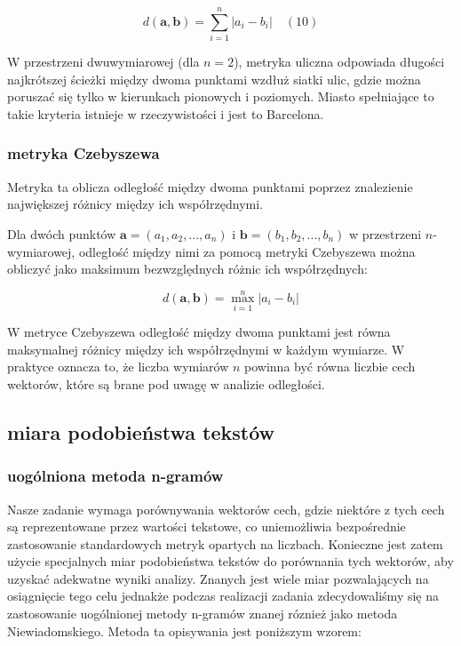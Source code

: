 \documentclass{article}
\begin{document}
\begin{equation} d(\mathbf{a}, \mathbf{b}) = \sum_{i=1}^{n} |a_i - b_i| \quad(10) \end{equation}

\noindent W przestrzeni dwuwymiarowej (dla $n = 2$), metryka uliczna odpowiada długości najkrótszej ścieżki między dwoma punktami wzdłuż siatki ulic, gdzie można poruszać się tylko w kierunkach pionowych i poziomych. Miasto spełniające to takie kryteria istnieje w rzeczywistości i jest to Barcelona. \newline




\subsubsection*{metryka Czebyszewa}

Metryka ta oblicza odległość między dwoma punktami poprzez znalezienie największej różnicy między ich współrzędnymi. \newline

\noindent Dla dwóch punktów $\mathbf{a} = (a_1, a_2, ..., a_n)$ i $\mathbf{b} = (b_1, b_2, ..., b_n)$ w przestrzeni $n$-wymiarowej, odległość między nimi za pomocą metryki Czebyszewa można obliczyć jako maksimum bezwzględnych różnic ich współrzędnych:

\begin{equation} d(\mathbf{a},\mathbf{b}) = \max_{i=1}^{n} |a_i - b_i| \end{equation}

\noindent W metryce Czebyszewa odległość między dwoma punktami jest równa maksymalnej różnicy między ich współrzędnymi w każdym wymiarze. W praktyce oznacza to, że liczba wymiarów $n$ powinna być równa liczbie cech wektorów, które są brane pod uwagę w analizie odległości. \newline



\subsection*{miara podobieństwa tekstów}

\subsubsection*{uogólniona metoda n-gramów}

Nasze zadanie wymaga porównywania wektorów cech, gdzie niektóre z tych cech są reprezentowane przez wartości tekstowe, co uniemożliwia bezpośrednie zastosowanie standardowych metryk opartych na liczbach. Konieczne jest zatem użycie specjalnych miar podobieństwa tekstów do porównania tych wektorów, aby uzyskać adekwatne wyniki analizy. Znanych jest wiele miar pozwalających na osiągnięcie tego celu jednakże podczas realizacji zadania zdecydowaliśmy się na zastosowanie uogólnionej metody n-gramów znanej róznież jako metoda Niewiadomskiego. Metoda ta opisywania jest poniższym wzorem:
\end{document}
